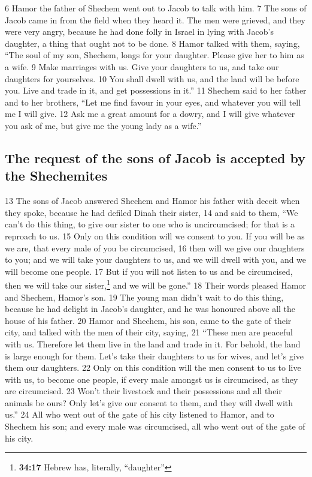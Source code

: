 {6} Hamor the father of Shechem went out to Jacob to talk with him. {7}
The sons of Jacob came in from the field when they heard it. The men
were grieved, and they were very angry, because he had done folly in
Israel in lying with Jacob's daughter, a thing that ought not to be
done. {8} Hamor talked with them, saying, ``The soul of my son, Shechem,
longs for your daughter. Please give her to him as a wife. {9} Make
marriages with us. Give your daughters to us, and take our daughters for
yourselves. {10} You shall dwell with us, and the land will be before
you. Live and trade in it, and get possessions in it.'' {11} Shechem
said to her father and to her brothers, ``Let me find favour in your
eyes, and whatever you will tell me I will give. {12} Ask me a great
amount for a dowry, and I will give whatever you ask of me, but give me
the young lady as a wife.''

\hypertarget{the-request-of-the-sons-of-jacob-is-accepted-by-the-shechemites}{%
\subsection{The request of the sons of Jacob is accepted by the
Shechemites}\label{the-request-of-the-sons-of-jacob-is-accepted-by-the-shechemites}}

{13} The sons of Jacob answered Shechem and Hamor his father with deceit
when they spoke, because he had defiled Dinah their sister, {14} and
said to them, ``We can't do this thing, to give our sister to one who is
uncircumcised; for that is a reproach to us. {15} Only on this condition
will we consent to you. If you will be as we are, that every male of you
be circumcised, {16} then will we give our daughters to you; and we will
take your daughters to us, and we will dwell with you, and we will
become one people. {17} But if you will not listen to us and be
circumcised, then we will take our sister,\footnote{\textbf{34:17}
  Hebrew has, literally, ``daughter''} and we will be gone.'' {18} Their
words pleased Hamor and Shechem, Hamor's son. {19} The young man didn't
wait to do this thing, because he had delight in Jacob's daughter, and
he was honoured above all the house of his father. {20} Hamor and
Shechem, his son, came to the gate of their city, and talked with the
men of their city, saying, {21} ``These men are peaceful with us.
Therefore let them live in the land and trade in it. For behold, the
land is large enough for them. Let's take their daughters to us for
wives, and let's give them our daughters. {22} Only on this condition
will the men consent to us to live with us, to become one people, if
every male amongst us is circumcised, as they are circumcised. {23}
Won't their livestock and their possessions and all their animals be
ours? Only let's give our consent to them, and they will dwell with
us.'' {24} All who went out of the gate of his city listened to Hamor,
and to Shechem his son; and every male was circumcised, all who went out
of the gate of his city.

